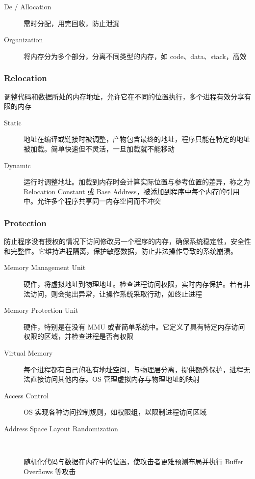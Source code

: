 \documentclass[11pt,journal,compsoc]{IEEEtran}
\begin{document}
\begin{description}
    \item[De / Allocation] 需时分配，用完回收，防止泄漏

    \item[Organization] 将内存分为多个部分，分离不同类型的内存，如 code、data、stack，高效
\end{description}


\subsubsection{Relocation}

调整代码和数据所处的内存地址，允许它在不同的位置执行，多个进程有效分享有限的内存

\begin{description}
    \item[Static] 地址在编译或链接时被调整，产物包含最终的地址，程序只能在特定的地址被加载。简单快速但不灵活，一旦加载就不能移动

    \item[Dynamic] 运行时调整地址。加载到内存时会计算实际位置与参考位置的差异，称之为 Relocation Constant 或 Base Address，被添加到程序中每个内存的引用中。允许多个程序共享同一内存空间而不冲突
\end{description}


\subsubsection{Protection}

防止程序没有授权的情况下访问修改另一个程序的内存，确保系统稳定性，安全性和完整性。它维持进程隔离，保护敏感数据，防止非法操作导致的系统崩溃。

\begin{description}
    \item[Memory Management Unit] 硬件，将虚拟地址到物理地址。检查进程访问权限，实时内存保护。若有非法访问，则会抛出异常，让操作系统采取行动，如终止进程

    \item[Memory Protection Unit] 硬件，特别是在没有 MMU 或者简单系统中。它定义了具有特定内存访问权限的区域，并检查进程是否有权限

    \item[Virtual Memory] 每个进程都有自己的私有地址空间，与物理层分离，提供额外保护，进程无法直接访问其他内存。OS 管理虚拟内存与物理地址的映射

    \item[Access Control] OS 实现各种访问控制规则，如权限组，以限制进程访问区域

    \item[Address Space Layout Randomization] ~
    
    随机化代码与数据在内存中的位置，使攻击者更难预测布局并执行 Buffer Overflows 等攻击
\end{description}
\end{document}
